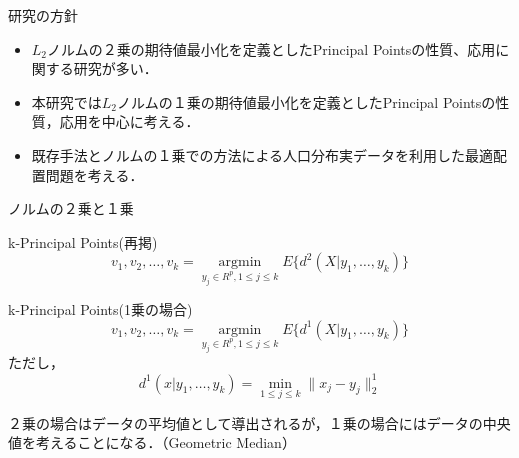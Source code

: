 \documentclass[unicode,11pt]{beamer}
\begin{document}
\begin{frame}{研究の方針}
    \begin{itemize}
        \item $L_2$ノルムの２乗の期待値最小化を定義としたPrincipal Pointsの性質、応用に関する研究が多い．
        \item 本研究では$L_2$ノルムの１乗の期待値最小化を定義としたPrincipal Pointsの性質，応用を中心に考える．
        \item 既存手法とノルムの１乗での方法による人口分布実データを利用した最適配置問題を考える．
    \end{itemize}
\end{frame}

\begin{frame}{ノルムの２乗と１乗}
    \begin{block}{k-Principal Points(再掲)}
        \begin{equation*}
            v_1,v_2,\dots,v_k = \underset{y_j \in R^p, 1\le j \le k}{\operatorname{argmin}} E\{d^2(X|y_1,\dots, y_k)\}
        \end{equation*}
    \end{block}

    \begin{block}{k-Principal Points(1乗の場合)}
        \begin{equation*}
            v_1,v_2,\dots,v_k = \underset{y_j \in R^p, 1\le j \le k}{\operatorname{argmin}} E\{d^1(X|y_1,\dots, y_k)\}
        \end{equation*}
        ただし，
        \begin{equation*}
            d^1(x|y_1,\dots,y_k) = \min_{1\le j \le k}{\lVert x_j - y_j\rVert_2^1}
        \end{equation*}
    \end{block}
    ２乗の場合はデータの平均値として導出されるが，１乗の場合にはデータの中央値を考えることになる．（Geometric Median）
\end{frame}
\end{document}
